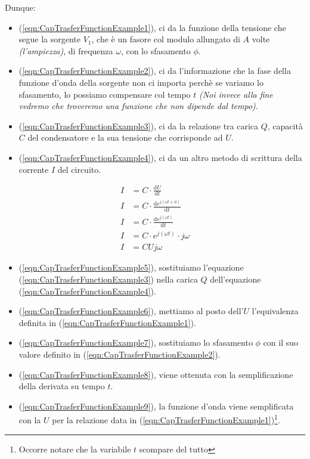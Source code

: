 \documentclass[a4paper, 10pt, final]{article} %
\begin{document}
    \noindent Dunque:
    \begin{itemize}
        \item (\ref{eqn:CapTrasferFunctionExample1}), ci da la funzione della tensione che segue la sorgente $V_1$, che \`{e} un 
        fasore col modulo allungato di $A$ volte \emph{(l'ampiezza)}, di frequenza $\omega$, con lo sfasamento $\phi$.
        \item (\ref{eqn:CapTrasferFunctionExample2}), ci da l'informazione che la fase della funzione d'onda della sorgente non ci importa perch\`{e} se variamo lo sfasamento, lo possiamo compensare col tempo $t$ \emph{(Noi invece alla fine vedremo che troveremo una funzione che non dipende dal tempo)}.
        \item (\ref{eqn:CapTrasferFunctionExample3}), ci da la relazione tra carica $Q$, capacit\`{a} $C$ del condensatore e la sua tensione che corrisponde ad $U$.
        \item (\ref{eqn:CapTrasferFunctionExample4}), ci da un altro metodo di scrittura della corrente $I$ del circuito.
    \end{itemize} 
    \begin{align}
        I &= C \cdot \frac{\textrm{d}U}{\textrm{d}t} \label{eqn:CapTrasferFunctionExample5} \\
        I &= C \cdot \frac{\textrm{d}e^{j \left( \omega t + \phi \right)}}{\textrm{d}t} \label{eqn:CapTrasferFunctionExample6} \\
        I &= C \cdot \frac{\textrm{d}e^{j \left( \omega t\right)}}{\textrm{d}t} \label{eqn:CapTrasferFunctionExample7} \\
        I &= C \cdot e^{j \left( \omega t \right)} \cdot j \omega \label{eqn:CapTrasferFunctionExample8} \\
        I &= C U j \omega \label{eqn:CapTrasferFunctionExample9}
    \end{align}
    \begin{itemize}
        \item (\ref{eqn:CapTrasferFunctionExample5}), sostituiamo l'equazione (\ref{eqn:CapTrasferFunctionExample3}) nella carica $Q$ dell'equazione (\ref{eqn:CapTrasferFunctionExample4}).
        \item (\ref{eqn:CapTrasferFunctionExample6}), mettiamo al posto dell'$U$ l'equivalenza definita in (\ref{eqn:CapTrasferFunctionExample1}).
        \item (\ref{eqn:CapTrasferFunctionExample7}), sostituiamo lo sfasamento $\phi$ con il suo valore definito in (\ref{eqn:CapTrasferFunctionExample2}).
        \item (\ref{eqn:CapTrasferFunctionExample8}), viene ottenuta con la semplificazione della derivata su tempo $t$.
        \item (\ref{eqn:CapTrasferFunctionExample9}), la funzione d'onda viene semplificata con la $U$ per la relazione data in (\ref{eqn:CapTrasferFunctionExample1})\footnote{Occorre notare che la variabile $t$ scompare del tutto}.
    \end{itemize}
\end{document}
